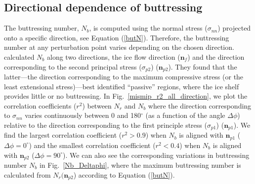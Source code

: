 \documentclass[tc, manuscript]{copernicus}
\begin{document}
\subsection{Directional dependence of buttressing}

The buttressing number, $N_b$, is computed using the normal stress ($\sigma_{nn}$) projected onto a specific direction, see Equation (\ref{butN}). Therefore, the buttressing number at any perturbation point varies depending on the chosen direction. \citet{furst2016} calculated $N_b$ along two directions, the ice flow direction ($\mathbf{n}_f$) and the direction corresponding to the second principal stress ($\sigma_{p2}$) ($\mathbf{n}_{p2}$). They found that the latter---the direction corresponding to the maximum compressive stress (or the least extensional stress)---best identified ``passive'' regions, where the ice shelf provides little or no buttressing. In Fig.~\ref{mismip_r2_all_direction}, we plot the correlation coefficients ($r^2$) between $N_r$ and $N_b$ where the direction corresponding to $\sigma_{nn}$ varies continuously between 0 and 180$^\circ$ (as a function of the angle $\Delta \phi$) relative to the direction corresponding to the first principle stress ($\sigma_{p1}$) ($\mathbf{n}_{p1}$). We find the largest correlation coefficient ($r^2>0.9$) when $N_b$ is aligned with $\mathbf{n}_{p1}$ ($\Delta \phi=0^\circ$) and the smallest correlation coefficient ($r^2<0.4$) when $N_b$ is aligned with $\mathbf{n}_{p2}$ ($\Delta \phi=90^\circ$). We can also see the corresponding variations in buttressing number $N_b$ in Fig.~\ref{Nb_Deltaphi}, where the maximum buttressing number is calculated from $N_r(\mathbf{n}_{p2}$) according to Equation (\ref{butN}).
\end{document}
